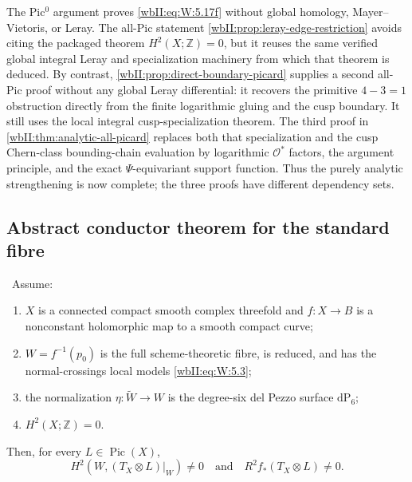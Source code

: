 \begin{remark}
The Pic$^0$ argument proves \eqref{wbII:eq:W:5.17f} without global homology,
Mayer--Vietoris, or Leray.  The all-Pic statement
\cref{wbII:prop:leray-edge-restriction} avoids citing the packaged theorem
$H^2(X;\mathbb Z)=0$, but it reuses the same verified global integral
Leray and specialization machinery from which that theorem is deduced.
By contrast, \cref{wbII:prop:direct-boundary-picard} supplies a second all-Pic
proof without any global Leray differential: it recovers the primitive
$4-3=1$ obstruction directly from the finite logarithmic gluing and the
cusp boundary.  It still uses the local integral cusp-specialization
theorem.  The third proof in \cref{wbII:thm:analytic-all-picard} replaces both
that specialization and the cusp Chern-class bounding-chain evaluation by
logarithmic $\mathcal O^*$ factors, the argument principle, and the exact
$\Psi$-equivariant support function.  Thus the purely analytic
strengthening is now complete; the three proofs have different
dependency sets.
\end{remark}

\subsection{Abstract conductor theorem for the standard fibre}

\begin{theorem}
\label{wbII:thm:candidate-conductor}
\ Assume:
\begin{enumerate}[label=(H\arabic*)]
\item $X$ is a connected compact smooth complex threefold and
$f:X\to B$ is a nonconstant holomorphic map to a smooth compact curve;
\item $W=f^{-1}(p_0)$ is the full scheme-theoretic fibre, is reduced, and
has the normal-crossings local models \eqref{wbII:eq:W:5.3};
\item the normalization $\eta:\widetilde W\to W$ is the degree-six del
Pezzo surface $\mathrm{dP}_6$;
\item $H^2(X;\mathbb Z)=0$.
\end{enumerate}
Then, for every $L\in\operatorname{Pic}(X)$,
\[
H^2(W,(T_X\otimes L)|_W)\ne0
\quad\text{and}\quad
R^2f_*(T_X\otimes L)\ne0.
\tag{W.45}\label{wbII:eq:W:5.18}
\]
\end{theorem}

